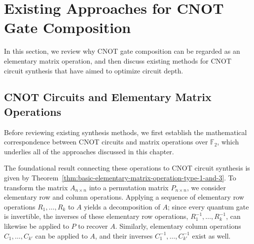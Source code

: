\chapter{Existing Approaches for CNOT Gate Composition}
\label{ch:existing-approaches}

In this section, we review why CNOT gate composition can be regarded as an
elementary matrix operation, and then discuss existing methods for CNOT
circuit synthesis that have aimed to optimize circuit depth.

\section{CNOT Circuits and Elementary Matrix Operations}
\label{sec:CNOT-transformation-to-Matrix-Operations}
Before reviewing existing synthesis methods, we first establish the mathematical correspondence between CNOT circuits and matrix operations over $\mathbb{F}_{2}$, which underlies all of the approaches discussed in this chapter.

The foundational result connecting these operations to CNOT circuit
synthesis is given by Theorem~\ref{thm:basic-elementary-matrix-operation-type-1-and-3}. To transform the
matrix $A_{n \times n}$ into a permutation matrix $P_{n \times n}$, we
consider elementary row and column operations. Applying a sequence of
elementary row operations $R_{1}, \ldots, R_{k}$ to $A$ yields a
decomposition of $A$; since every quantum gate is invertible, the inverses
of these elementary row operations, $R_{1}^{-1}, \ldots, R_{k}^{-1}$, can
likewise be applied to $P$ to recover $A$. Similarly, elementary column
operations $C_{1}, \ldots, C_{k'}$ can be applied to $A$, and their inverses
$C_{1}^{-1}, \ldots, C_{k'}^{-1}$ exist as well.

